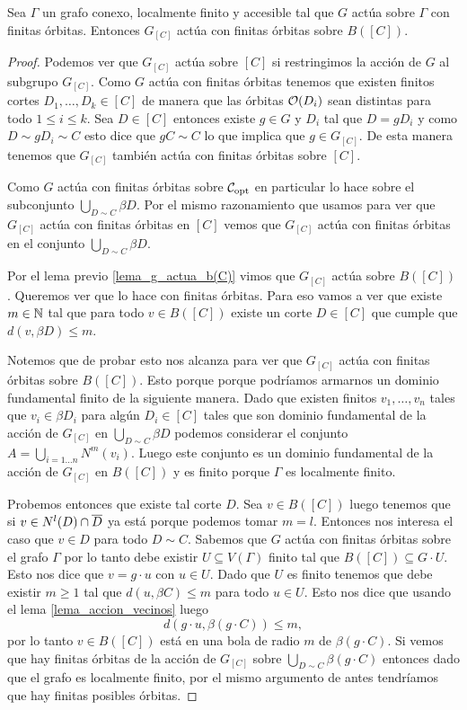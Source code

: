 \documentclass[tesis.tex]{subfiles}
\begin{document}
\begin{lema}\label{lema_accion_b(C)}
	Sea $\Gamma$ un grafo conexo, localmente finito y accesible tal que $G$ actúa sobre $\Gamma$ con finitas órbitas.
	Entonces $G_{[C]}$ actúa con finitas órbitas sobre $B([C])$.
\end{lema}
\begin{proof}
	Podemos ver que $G_{[C]}$ actúa sobre $[C]$ si restringimos la acción de $G$ al subgrupo $G_{[C]}$.
	Como $G$ actúa con finitas órbitas tenemos que existen finitos cortes $D_{1}, \dots, D_{k} \in [C]$ de manera que las órbitas ${\cal O}(D_{i})$ sean distintas para todo $1 \le i \le k$.
	Sea $D \in [C]$ entonces existe $g \in G$ y $D_{i}$ tal que $D = gD_{i}$ y como $D \sim gD_{i} \sim C$ esto dice que $gC \sim C$ lo que implica que 
	$g \in G_{[C]}$.
	De esta manera tenemos que $G_{[C]}$ también actúa con finitas órbitas sobre $[C]$. 

	Como $G$ actúa con finitas órbitas sobre ${\cal C}_{\text{opt}}$ en particular lo hace sobre el subconjunto $\bigcup_{D \sim C} \beta D$.
	Por el mismo razonamiento que usamos para ver que $G_{[C]}$ actúa con finitas órbitas en $[C]$ vemos que $G_{[C]}$ actúa con finitas órbitas en el conjunto $ \bigcup_{D \sim C} \beta D $.
	
	Por el lema previo \ref{lema_g_actua_b(C)} vimos que $G_{[C]}$ actúa sobre $B([C])$.
	Queremos ver que lo hace con finitas órbitas.
	Para eso vamos a ver que existe $m \in \mathbb{N}$ tal que para todo $v \in B([C])$ existe un corte $D \in [C]$ que cumple que
	$d(v,\beta D) \le m$.
	
	Notemos que de probar esto nos alcanza para ver que $G_{[C]}$ actúa con finitas órbitas sobre $B([C])$.
	Esto porque porque podríamos armarnos un dominio fundamental finito de la siguiente manera.
	Dado que existen finitos $v_{1}, \dots, v_{n}$ tales que $v_{i} \in \beta D_{i}$ para algún $D_{i} \in [C]$ tales que son dominio fundamental de la acción de $G_{[C]}$ en $\bigcup_{D \sim C} \beta D$ podemos considerar el conjunto 
	$A  = \bigcup_{i=1 \dots n} N^m(v_{i})$. 
	Luego este conjunto es un dominio fundamental de la acción de $G_{[C]}$ en $B([C])$ y es finito porque $\Gamma$ es localmente finito.
	
	
	
	Probemos entonces que existe tal corte $D$.
	Sea $v \in B([C])$ luego tenemos que si $v \in N^l(D) \cap \overline D$ ya está porque podemos tomar $m=l$.
	Entonces nos interesa el caso que $v \in D$ para todo $D \sim C$.
	Sabemos que $G$ actúa con finitas órbitas sobre el grafo $\Gamma$ por lo tanto debe existir $U \subseteq V(\Gamma)$ finito tal que $B([C]) \subseteq G \cdot U$.
	Esto nos dice que $v = g \cdot u$ con $u \in U$.
	Dado que $U$ es finito tenemos que debe existir $m \ge 1$ tal que $d(u,\beta C) \le m$ para todo $u \in U$.
	Esto nos dice que usando el lema \ref{lema_accion_vecinos} luego
	\[
		d(g \cdot u, \beta (g \cdot C)) \le m,
	\]
	por lo tanto $v \in B([C])$ está en una bola de radio $m$ de $\beta (g \cdot C)$.
	Si vemos que hay finitas órbitas de la acción de $G_{[C]}$ sobre $\bigcup_{D \sim C} \beta (g \cdot C)$ entonces dado que el grafo es localmente finito, por el mismo argumento de antes tendríamos que hay finitas posibles órbitas.
	

\end{proof}
\end{document}

